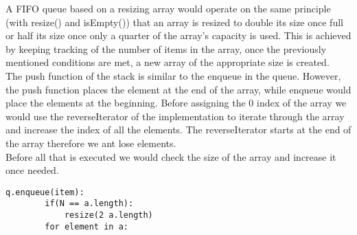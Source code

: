 \documentclass[a4paper]{article}
\begin{document}
\noindent
A FIFO queue based on a resizing array would operate on the same principle (with resize() and isEmpty()) that an array is resized 
to double its size once full or half its size once only a quarter of the array's capacity is used. This is achieved by keeping tracking of 
the number of items in the array, once the previously mentioned conditions are met, a new array 
of the appropriate size is created.
\ \\

\noindent
The push function of the stack is similar to the enqueue in the queue. However, the push function places the element at the end of the array, while enqueue would place the elements at the beginning. Before assigning the 0 index of the array we would use the reverseIterator of the implementation to iterate through the array and increase the index of all the elements. The reverseIterator starts at the end of the array therefore we ant lose elements.
\ \\

\noindent
Before all that is executed we would check the size of the array and increase it once needed.

\begin{lstlisting}[escapeinside={{*}{*}}]
    q.enqueue(item):
    	if(N == a.length):
    		resize(2 a.length)
    	for element in a:
    		
\end{lstlisting}
\end{document}
